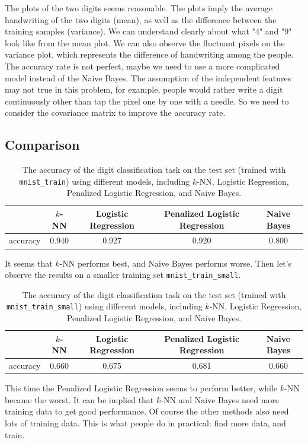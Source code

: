 \documentclass{article}
\begin{document}
The plots of the two digits seems reasonable. The plots imply the average handwriting of the two digits (mean), as well as the difference between the training samples (variance). We can understand clearly about what "4" and "9" look like from the mean plot. We can also observe the fluctuant pixels on the variance plot, which represents the difference of handwriting among the people.\\

The accuracy rate is not perfect, maybe we need to use a more complicated model instead of the Naive Bayes. The assumption of the independent features may not true in this problem, for example, people would rather write a digit continuously other than tap the pixel one by one with a needle. So we need to consider the covariance matrix to improve the accuracy rate.\\

\subsection{Comparison}

\begin{table}[htbp]
\centering
\begin{tabular}{lcccc}
\toprule
\ & $k$-NN & Logistic Regression & Penalized Logistic Regression & Naive Bayes\\
\midrule
accuracy & 0.940 & 0.927 & 0.920 & 0.800\\
\bottomrule
\end{tabular}
\caption{The accuracy of the digit classification task on the test set (trained with \texttt{mnist\_train}) using different models, including $k$-NN, Logistic Regression, Penalized Logistic Regression, and Naive Bayes. 
\label{table:acc-all}}
\end{table}

It seems that $k$-NN performs best, and Naive Bayes performs worse. Then let's observe the results on a smaller training set \texttt{mnist\_train\_small}.\\

\begin{table}[htbp]
\centering
\begin{tabular}{lcccc}
\toprule
\ & $k$-NN & Logistic Regression & Penalized Logistic Regression & Naive Bayes\\
\midrule
accuracy & 0.660 & 0.675 & 0.681 & 0.660\\
\bottomrule
\end{tabular}
\caption{The accuracy of the digit classification task on the test set (trained with \texttt{mnist\_train\_small}) using different models, including $k$-NN, Logistic Regression, Penalized Logistic Regression, and Naive Bayes. 
\label{table:acc-s-all}}
\end{table}

This time the Penalized Logistic Regression seems to perform better, while $k$-NN became the worst. It can be implied that $k$-NN and Naive Bayes need more training data to get good performance. Of course the other methods also need lots of training data. This is what people do in practical: find more data, and train.\\
\end{document}
